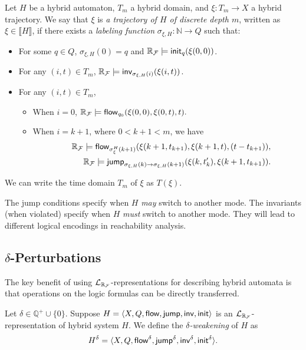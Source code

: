 \documentclass[12pt]{article}
\begin{document}
\begin{definition}\label{trajec}
Let $H$ be a hybrid automaton, $T_m$ a hybrid domain, and $\xi: T_m\rightarrow X$ a hybrid trajectory.
We say that $\xi$ is {\em a trajectory of $H$ of discrete depth $m$}, written as $\xi\in \llbracket H \rrbracket$, if there
exists a {\em labeling function} $\sigma_{\xi,H}: \mathbb{N}\rightarrow Q$ such
that:
\begin{itemize}
\item For some $q\in Q$, $\sigma_{\xi,H}(0) = q$ and $\mathbb{R}_{\mathcal{F}}\models \mathsf{init}_{q}(\xi(0,0))$.
\item For any $(i, t)\in T_m$, $\mathbb{R}_{\mathcal{F}}\models \mathsf{inv}_{\sigma_{\xi,H}(i)} (\xi(i,t))$.
\item For any $(i,t)\in T_m$, 
\begin{itemize}
\item When $i=0$, $\mathbb{R}_{\mathcal{F}}\models\mathsf{flow}_{q_0}(\xi(0,0), \xi(0,t), t).$
\item When $i = k+1$, where $0<k+1<m$, we have
\begin{eqnarray*}
& &\mathbb{R}_{\mathcal{F}}\models\mathsf{flow}_{\sigma^H_{\xi}(k+1)}(\xi(k+1, t_{k+1}), \xi(k+1, t), (t - t_{k+1})),\\
& &\mathbb{R}_{\mathcal{F}}\models \mathsf{jump}_{\sigma_{\xi,H}(k)\rightarrow\sigma_{\xi,H}(k+1)}(\xi(k, t_k'), \xi(k+1,t_{k+1})).
\end{eqnarray*}
\end{itemize}
\end{itemize}
We can write the time domain $T_m$ of $\xi$ as $T(\xi)$.
\end{definition}
\begin{remark} The jump conditions specify when $H$ {\em may}  switch to another mode. The invariants (when violated) specify when $H$ {\em must} switch to another mode. They will lead to different logical encodings in reachability analysis. 
\end{remark}


\subsection{$\delta$-Perturbations}

The key benefit of using $\mathcal{L}_{\mathbb{R}_{\mathcal{F}}}$-representations for describing hybrid automata is that operations on the logic formulas can be directly transferred.
\begin{definition} Let $\delta\in\mathbb{Q}^+\cup\{0\}$. Suppose $H = \langle X, Q, \mathsf{flow}, \mathsf{jump}, \mathsf{inv}, \mathsf{init}\rangle$ is an $\mathcal{L}_{\mathbb{R}_{\mathcal{F}}}$-representation of hybrid system $H$. We define the {\em $\delta$-weakening} of $H$ as
$$H^{\delta} = \langle X, Q, \mathsf{flow}^{\delta}, \mathsf{jump}^{\delta}, \mathsf{inv}^{\delta},
\mathsf{init}^{\delta}\rangle.$$
\end{definition}
\end{document}
